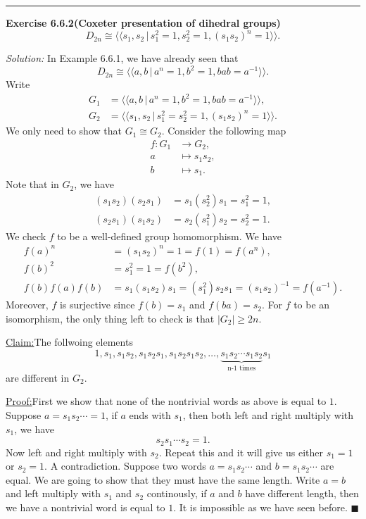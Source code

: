 \documentclass[a4paper, 12pt]{article}
\newenvironment{problem}[2][Exercise]
    { \begin{mdframed}[backgroundcolor=gray!20] \textbf{#1 #2} \\}
    {  \end{mdframed}}
\newenvironment{solution}
    {\textit{Solution:}}
    {}
\newenvironment{claim}[1]{\par\noindent\underline{Claim:}\space#1}{}
\newenvironment{claimproof}[1]{\par\noindent\underline{Proof:}\space#1}{\hfill $\blacksquare$}
\newcommand{\la}{\langle}
\newcommand{\ra}{\rangle}
\begin{document}
\noindent\rule{7in}{2.8pt}
\begin{problem}{6.6.2(Coxeter presentation of dihedral groups)}
\[D_{2n}\cong \la\la s_1,s_2\,|\, s_1^2=1,s_2^2=1,(s_1s_2)^n=1\ra\ra. \]
\end{problem}
\begin{solution}
In Example 6.6.1, we have already seen that 
\[D_{2n}\cong \la\la a,b\,|\, a^n=1,b^2=1,bab=a^{-1}\ra\ra.\]
Write
\begin{align*}
G_1&=\la\la a,b\,|\, a^n=1,b^2=1,bab=a^{-1}\ra\ra,\\ 
G_2&= \la\la s_1,s_2\,|\, s_1^2=s_2^2=1, (s_1s_2)^n=1\ra\ra.
\end{align*}
We only need to show that \(G_1\cong G_2\).
Consider the following map 
\begin{align*}
    f:G_1&\rightarrow G_2,\\ 
    a&\mapsto s_1s_2,\\ 
    b&\mapsto s_1.
\end{align*}
Note that in \(G_2\), we have 
\begin{align*}
(s_1s_2)(s_2s_1)&=s_1(s_2^2)s_1=s_1^2=1,\\ 
(s_2s_1)(s_1s_2)&=s_2(s_1^2)s_2=s_2^2=1.
\end{align*}
We check \(f\) to be a well-defined group homomorphism. We have 
\begin{align*}
f(a)^n&=(s_1s_2)^n=1=f(1)=f(a^n),\\ 
f(b)^2&=s_1^2=1=f(b^2),\\ 
f(b)f(a)f(b)&=s_1(s_1s_2)s_1=(s_1^2)s_2s_1=(s_1s_2)^{-1}=f(a^{-1}).
\end{align*} 
Moreover, \(f\) is surjective since \(f(b)=s_1\) and \(f(ba)=s_2\). For \(f\) to be an isomorphism, the only thing left to check is that \(|G_2|\geq 2n\). 
\begin{claim}
 The follwoing elements 
 \[1,s_1,s_1s_2,s_1s_2s_1,s_1s_2s_1s_2,\ldots, \underbrace{s_1s_2\cdots s_1s_2}_\text{n-1 times}s_1\]
 are different in \(G_2\).   
\end{claim}
\begin{claimproof}
First we show that none of the nontrivial words as above is equal to \(1\). Suppose \(a=s_1s_2\cdots=1\), if \(a\) ends with \(s_1\), then both left and right multiply with \(s_1\), we have 
\[s_2s_1\cdots s_2=1.\]
Now left and right multiply with \(s_2\). Repeat this and it will give us either \(s_1=1\) or \(s_2=1\). A contradiction. Suppose two words \(a=s_1s_2\cdots\) and \(b=s_1s_2\cdots\) are equal. We are 
going to show that they must have the same length. Write \(a=b\) and left multiply with \(s_1\) and \(s_2\) continously, if \(a\) and \(b\) have different length, then we have a nontrivial word is equal to \(1\). It is 
impossible as we have seen before.  
\end{claimproof}
\end{solution}
\end{document}
